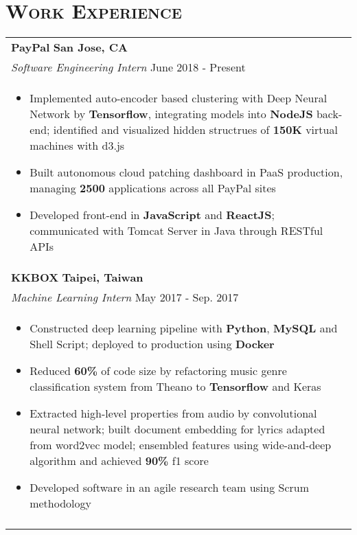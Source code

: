 \documentclass[letterpaper,11pt]{article} %
\begin{document}
{%
\section{\Large\bf\textsc{Work Experience}}
\begin{tabular}{p{18.5cm}}

{\bf{PayPal}} \hfill \bf{San Jose, CA}\\
{\it Software Engineering Intern} \hfill June 2018 - Present\\%
\begin{itemize}
\vspace{-3mm}
\item Implemented auto-encoder based clustering with Deep Neural Network by {\bf Tensorflow}, integrating models into {\bf NodeJS} back-end; identified and visualized hidden structrues of {\bf 150K} virtual machines with d3.js 
\item Built autonomous cloud patching dashboard in PaaS production, managing {\bf 2500} applications across all PayPal sites 
\item Developed front-end in {\bf JavaScript} and {\bf ReactJS}; communicated with Tomcat Server in Java through RESTful APIs
\vspace*{-\baselineskip} 
\end{itemize} \\ 
\vspace{.1mm}

{\bf{KKBOX}} \hfill \bf{Taipei, Taiwan}\\
{\it Machine Learning Intern} \hfill  May 2017 - Sep. 2017\\%
\begin{itemize}
\vspace{-3mm}
\item Constructed deep learning pipeline with {\bf Python}, {\bf MySQL} and Shell Script; deployed to production using {\bf Docker}
\item Reduced {\bf 60\%} of code size by refactoring music genre classification system from Theano to {\bf Tensorflow} and Keras 
\item Extracted high-level properties from audio by convolutional neural network; built document embedding for lyrics adapted from word2vec model; ensembled features using wide-and-deep algorithm and achieved {\bf 90\%} f1 score 
\item Developed software in an agile research team using Scrum methodology \vspace*{-\baselineskip}
\end{itemize} \\ 
\vspace{.1mm}


\end{tabular}}
\end{document}
